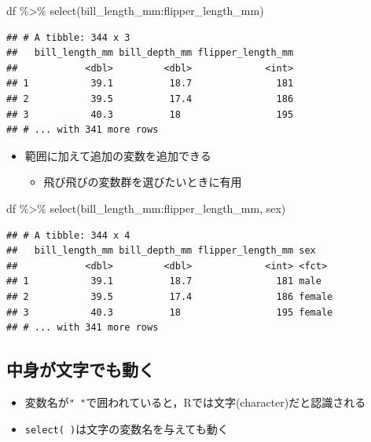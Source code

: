\documentclass[
  xelatex,ja=standard, b5paper]{bxjsbook}
\newenvironment{Shaded}{\begin{snugshade}}{\end{snugshade}}
\newcommand{\FunctionTok}[1]{\textcolor[rgb]{0.00,0.00,0.00}{#1}}
\newcommand{\NormalTok}[1]{#1}
\newcommand{\SpecialCharTok}[1]{\textcolor[rgb]{0.00,0.00,0.00}{#1}}
\providecommand{\tightlist}{%
  \setlength{\itemsep}{0pt}\setlength{\parskip}{0pt}}
\begin{document}
\begin{Shaded}
\begin{Highlighting}[]
\NormalTok{df }\SpecialCharTok{\%\textgreater{}\%} 
  \FunctionTok{select}\NormalTok{(bill\_length\_mm}\SpecialCharTok{:}\NormalTok{flipper\_length\_mm)}
\end{Highlighting}
\end{Shaded}

\begin{verbatim}
## # A tibble: 344 x 3
##   bill_length_mm bill_depth_mm flipper_length_mm
##            <dbl>         <dbl>             <int>
## 1           39.1          18.7               181
## 2           39.5          17.4               186
## 3           40.3          18                 195
## # ... with 341 more rows
\end{verbatim}

\begin{itemize}
\tightlist
\item
  範囲に加えて追加の変数を追加できる

  \begin{itemize}
  \tightlist
  \item
    飛び飛びの変数群を選びたいときに有用
  \end{itemize}
\end{itemize}

\begin{Shaded}
\begin{Highlighting}[]
\NormalTok{df }\SpecialCharTok{\%\textgreater{}\%} 
  \FunctionTok{select}\NormalTok{(bill\_length\_mm}\SpecialCharTok{:}\NormalTok{flipper\_length\_mm, sex)}
\end{Highlighting}
\end{Shaded}

\begin{verbatim}
## # A tibble: 344 x 4
##   bill_length_mm bill_depth_mm flipper_length_mm sex   
##            <dbl>         <dbl>             <int> <fct> 
## 1           39.1          18.7               181 male  
## 2           39.5          17.4               186 female
## 3           40.3          18                 195 female
## # ... with 341 more rows
\end{verbatim}

\hypertarget{select-cha}{%
\subsection{中身が文字でも動く}\label{select-cha}}

\begin{itemize}
\tightlist
\item
  変数名が\texttt{"\ "}で囲われていると，Rでは文字(character)だと認識される
\item
  \texttt{select(\ )}は文字の変数名を与えても動く
\end{itemize}
\end{document}
